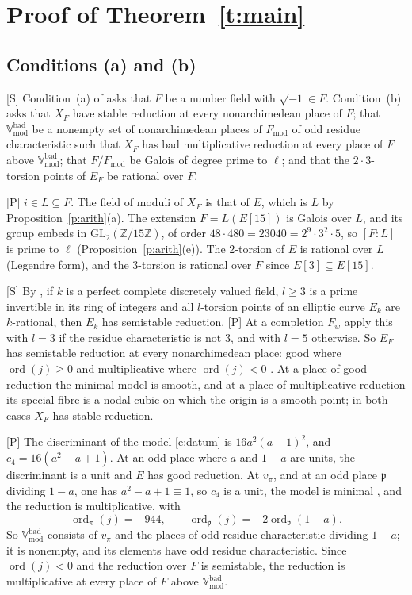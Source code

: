\documentclass[11pt,a4paper]{article}
\newcommand{\Z}{\mathbb{Z}}
\newcommand{\Fmod}{F_{\mathrm{mod}}}
\newcommand{\Vbadmod}{\mathbb{V}^{\mathrm{bad}}_{\mathrm{mod}}}
\newcommand{\ord}{\operatorname{ord}}
\newcommand{\GL}{\mathrm{GL}}
\newcommand{\tS}{\textup{[S]}}
\newcommand{\tP}{\textup{[P]}}
\theoremstyle{plain}
\theoremstyle{definition}
\begin{document}
\section{Proof of Theorem~\ref{t:main}}\label{s:proof}

\subsection{Conditions (a) and (b)}\label{ss:ab}

\tS{} Condition~(a) of \cite[Def.~3.1]{IUT1} asks that $F$ be a number field with $\sqrt{-1}\in F$. Condition~(b)
asks that $X_F$ have stable reduction at every nonarchimedean place of $F$; that $\Vbadmod$ be a nonempty set of
nonarchimedean places of $\Fmod$ of odd residue characteristic such that $X_F$ has bad multiplicative reduction at
every place of $F$ above $\Vbadmod$; that $F/\Fmod$ be Galois of degree prime to $\ell$; and that the $2\cdot3$-torsion
points of $E_F$ be rational over $F$.

\tP{} $i\in L\subseteq F$. The field of moduli of $X_F$ is that of $E$, which is $L$ by
Proposition~\ref{p:arith}(a). The extension $F=L(E[15])$ is Galois over $L$, and its group embeds in
$\GL_2(\Z/15\Z)$, of order $48\cdot480=23040=2^9\cdot3^2\cdot5$, so $[F:L]$ is prime to $\ell$
(Proposition~\ref{p:arith}(e)). The $2$-torsion of $E$ is rational over $L$ (Legendre form), and the $3$-torsion is
rational over $F$ since $E[3]\subseteq E[15]$.

\tS{} By \cite[Prop.~1.8(v)]{IUT4}, if $k$ is a perfect complete discretely valued field, $l\ge3$ is a prime invertible in its
ring of integers and all $l$-torsion points of an elliptic curve $E_k$ are $k$-rational, then $E_k$ has semistable
reduction. \tP{} At a completion $F_w$ apply this with $l=3$ if the residue characteristic is not $3$, and with $l=5$
otherwise. So $E_F$ has semistable reduction at every nonarchimedean place: good where $\ord(j)\ge0$ and
multiplicative where $\ord(j)<0$ \cite[Props.~VII.5.1, VII.5.5]{Sil}. At a place of good reduction the minimal model is
smooth, and at a place of multiplicative reduction its special fibre is a nodal cubic on which the origin is a smooth
point; in both cases $X_F$ has stable reduction.

\tP{} The discriminant of the model \eqref{e:datum} is $16a^2(a-1)^2$, and $c_4=16(a^2-a+1)$. At an odd place where $a$
and $1-a$ are units, the discriminant is a unit and $E$ has good reduction. At $v_\pi$, and at an odd place $\mathfrak p$
dividing $1-a$, one has $a^2-a+1\equiv1$, so $c_4$ is a unit, the model is minimal \cite[\S VII.1]{Sil}, and the reduction is
multiplicative,
with
\[
 \ord_\pi(j)=-944,\qquad \ord_{\mathfrak p}(j)=-2\ord_{\mathfrak p}(1-a).
\]
So $\Vbadmod$ consists of $v_\pi$ and the places of odd residue characteristic dividing $1-a$; it is nonempty, and its
elements have odd residue characteristic. Since $\ord(j)<0$ and the reduction over $F$ is semistable, the reduction is
multiplicative at every place of $F$ above $\Vbadmod$.
\end{document}
